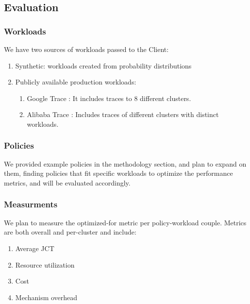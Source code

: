 \subsection{Evaluation}
\subsubsection{Workloads}
We have two sources of workloads passed to the Client:
\begin{enumerate}
    \item Synthetic: workloads created from probability distributions
    \item Publicly available production workloads: 
        \begin{enumerate}
            \item Google Trace \cite{google-cluster-data2019}: It includes traces to 8 different clusters. 
            \item Alibaba Trace \cite{alibabaclusterdata_2023}: Includes traces of different clusters with distinct workloads.        \end{enumerate}
\end{enumerate}

\subsubsection{Policies}
We provided example policies in the methodology section, and plan to expand on them, finding policies that  
fit specific workloads to optimize the performance metrics, and will be evaluated accordingly. 

\subsubsection{Measurments}
We plan to measure the optimized-for metric per policy-workload couple. 
Metrics are both overall and per-cluster and include:
\begin{enumerate}
    \item Average JCT
    \item Resource utilization
    \item Cost
    \item Mechanism overhead
\end{enumerate}